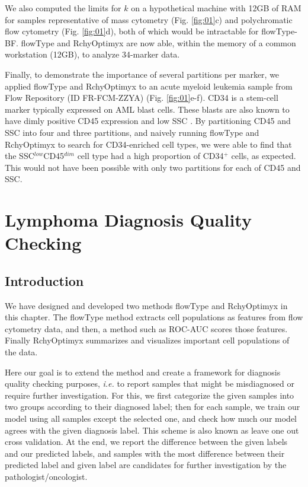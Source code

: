 We also computed the limits for $k$ on a hypothetical machine with 12GB of RAM for samples representative of mass cytometry (Fig. \ref{fig:01}c) and polychromatic flow cytometry (Fig. \ref{fig:01}d), both of which would be intractable for flowType-BF.
flowType and RchyOptimyx are now able, within the memory of a common workstation (12GB), to analyze 34-marker data. 

Finally, to demonstrate the importance of several partitions per marker, we applied flowType and RchyOptimyx to an acute myeloid leukemia sample from Flow Repository (ID FR-FCM-ZZYA) (Fig. \ref{fig:01}e-f).
CD34 is a stem-cell marker typically expressed on AML blast cells. These blasts are also known to have dimly positive CD45 expression and low SSC \cite{Vial2001}. 
By partitioning CD45 and SSC into four and three partitions, and naively running flowType and RchyOptimyx to search for CD34-enriched cell types, we were able to find that the SSC$^{low}$CD45$^{dim}$ cell type had a high proportion of CD34$^+$ cells, as expected.
This would not have been possible with only two partitions for each of CD45 and SSC.


\section{Lymphoma Diagnosis Quality Checking}
\subsection{Introduction}
We have designed and developed two methods flowType and RchyOptimyx in this chapter.
The flowType method extracts cell populations as features from flow cytometry data, and then, a method such as ROC-AUC scores those features. Finally RchyOptimyx summarizes and visualizes important cell populations of the data.

Here our goal is to extend the method and create a framework for diagnosis quality checking purposes, \emph{i.e.} to report samples that might be misdiagnosed or require further investigation. For this, we first categorize the given samples into two groups according to their diagnosed label; then for each sample, we train our model using all samples except the selected one, and check how much our model agrees with the given diagnosis label. This scheme is also known as leave one out cross validation. At the end, we report the difference between the given labels and our predicted labels, and samples with the most difference between their predicted label and given label are candidates for further investigation by the pathologist/oncologist.
